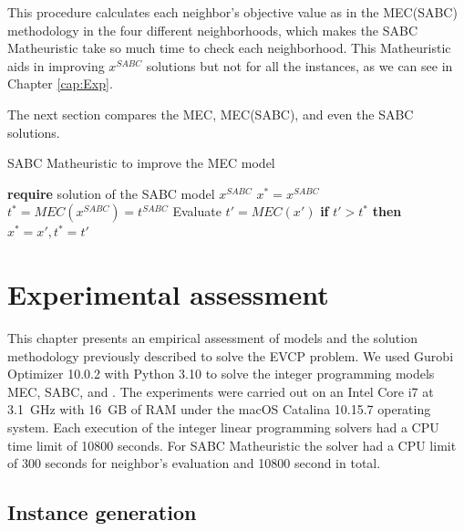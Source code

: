 This procedure calculates each neighbor's objective value as in the MEC(SABC) methodology in the four different neighborhoods, which makes the SABC Matheuristic take so much time to check each neighborhood. This Matheuristic aids in improving $x^{SABC}$ solutions but not for all the instances, as we can see in Chapter \ref{cap:Exp}.


The next section compares the MEC, MEC(SABC), and even the SABC so\-lu\-tions.  



\begin{algorithm}
\caption{SABC Matheuristic to improve the MEC model}\label{alg:cap_1}
\begin{algorithmic}[1]
\State \textbf{require} solution of the SABC model $x^{SABC}$
\State $x^* = x^{SABC}$
\State $t^* = MEC(x^{SABC}) = t^{SABC}$
		\State Evaluate $t'=MEC(x')$ 
    	\State \textbf{if } $t' > t^*$ \textbf{then}  $x^* = x', t^*=t'$ 
    \EndFor
\EndWhile
{}
\end{algorithmic}
\end{algorithm}



\chapter{Experimental assessment}\label{cap:assess}

  This chapter presents an empirical assessment of models and the solution methodology previously described to solve the EVCP problem.  
We used Gurobi Optimizer 10.0.2 with Python 3.10 to solve the integer programming models MEC, SABC, and .
The experiments were carried out on an Intel Core i7 at 3.1~GHz with 16~GB of RAM under the macOS Catalina 10.15.7 operating system. Each execution of the integer linear programming solvers had a CPU time limit of 10800 seconds. For SABC Matheuristic the solver had a CPU limit of 300 seconds for neighbor's evaluation and 10800 second in total.

\section{Instance generation} \label{instances}


